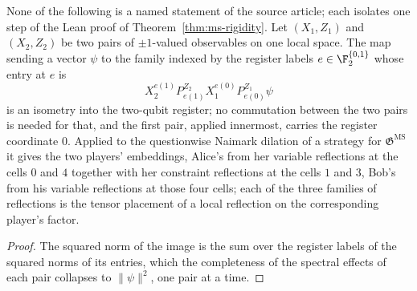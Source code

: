 \begin{lemma}\label{lem:ms-rigidity-support-two-qubit-swap}
	\leanok
	None of the following is a named statement of the source article; each isolates one step of the Lean proof of Theorem~\ref{thm:ms-rigidity}. Let $(X_1, Z_1)$ and $(X_2, Z_2)$ be two pairs of $\pm 1$-valued observables on one local space. The map sending a vector $\psi$ to the family indexed by the register labels $e \in \F_2^{\{0,1\}}$ whose entry at $e$ is
	\[
		X_2^{e(1)} P^{Z_2}_{e(1)} X_1^{e(0)} P^{Z_1}_{e(0)} \psi
	\]
	is an isometry into the two-qubit register; no commutation between the two pairs is needed for that, and the first pair, applied innermost, carries the register coordinate $0$. Applied to the questionwise Naimark dilation of a strategy for $\mathfrak{G}^{\mathrm{MS}}$ it gives the two players' embeddings, Alice's from her variable reflections at the cells $0$ and $4$ together with her constraint reflections at the cells $1$ and $3$, Bob's from his variable reflections at those four cells; each of the three families of reflections is the tensor placement of a local reflection on the corresponding player's factor.
\end{lemma}
\begin{proof}
	\leanok
	The squared norm of the image is the sum over the register labels of the squared norms of its entries, which the completeness of the spectral effects of each pair collapses to $\|\psi\|^2$, one pair at a time.
\end{proof}

